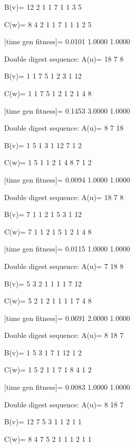 B(v)=
    12     2     1     1     7     1     1     3     5

C(w)=
     8     4     2     1     1     7     1     1     1     2     5

[time gen fitness]=
    0.0101    1.0000    1.0000

Double digest sequence:
A(u)=
    18     7     8

B(v)=
     1     1     7     5     1     2     3     1    12

C(w)=
     1     1     7     5     1     2     1     2     1     4     8

[time gen fitness]=
    0.1453    3.0000    1.0000

Double digest sequence:
A(u)=
     8     7    18

B(v)=
     1     5     1     3     1    12     7     1     2

C(w)=
     1     5     1     1     2     1     4     8     7     1     2

[time gen fitness]=
    0.0094    1.0000    1.0000

Double digest sequence:
A(u)=
    18     7     8

B(v)=
     7     1     1     2     1     5     3     1    12

C(w)=
     7     1     1     2     1     5     1     2     1     4     8

[time gen fitness]=
    0.0115    1.0000    1.0000

Double digest sequence:
A(u)=
     7    18     8

B(v)=
     5     3     2     1     1     1     1     7    12

C(w)=
     5     2     1     2     1     1     1     1     7     4     8

[time gen fitness]=
    0.0691    2.0000    1.0000

Double digest sequence:
A(u)=
     8    18     7

B(v)=
     1     5     3     1     7     1    12     1     2

C(w)=
     1     5     2     1     1     7     1     8     4     1     2

[time gen fitness]=
    0.0083    1.0000    1.0000

Double digest sequence:
A(u)=
     8    18     7

B(v)=
    12     7     5     3     1     1     2     1     1

C(w)=
     8     4     7     5     2     1     1     1     2     1     1

